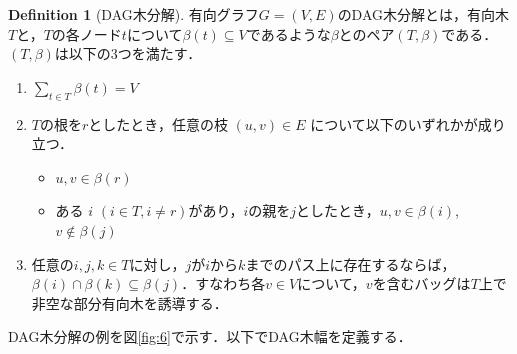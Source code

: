 \documentclass[master]{kuisthesis}		%
\theoremstyle{plain}
\theoremstyle{definition}
\newtheorem{definition*}{Definition}
\begin{document}
\begin{definition*}[DAG木分解]
 有向グラフ$G=(V, E)$のDAG木分解とは，有向木$T$と，$T$の各ノード$t$について$\beta(t) \subseteq V$であるような$\beta$とのペア$(T, \beta)$である．$(T, \beta)$は以下の3つを満たす．
 
\begin{enumerate}
    \item $\sum_{t\in T} \beta(t) = V$ 
    \item $T$の根を$r$としたとき，任意の枝 $ (u, v) \in E $ について以下のいずれかが成り立つ．
    \begin{itemize}
          \item $u, v \in \beta(r)$
          \item ある $i$ $(i \in T, i \neq r)$があり，$i$の親を$j$としたとき，$u, v \in \beta(i)$, $v \notin \beta(j)$
    \end{itemize}
    \item 任意の$ i, j, k \in T$に対し，$j$が$i$から$k$までのパス上に存在するならば，$\beta(i) \cap \beta(k) \subseteq \beta(j)$．すなわち各$v \in V$について，$v$を含むバッグは$T$上で非空な部分有向木を誘導する．
    \end{enumerate}
\end{definition*}



DAG木分解の例を図\ref{fig:6}で示す．以下でDAG木幅を定義する．
\end{document}
